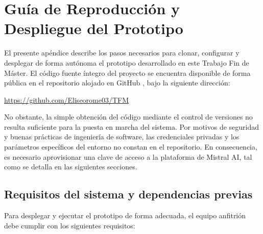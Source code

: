 \chapter{Guía de Reproducción y Despliegue del Prototipo}
\label{apendice:despliegue}

El presente apéndice describe los pasos necesarios para clonar, configurar y desplegar de forma autónoma el prototipo desarrollado en este Trabajo Fin de Máster. El código fuente íntegro del proyecto se encuentra disponible de forma pública en el repositorio alojado en GitHub \cite{tfmGitHub}, bajo la siguiente dirección:

\begin{center}
\url{https://github.com/Eliseorome03/TFM}
\end{center}

No obstante, la simple obtención del código mediante el control de versiones no resulta suficiente para la puesta en marcha del sistema. Por motivos de seguridad y buenas prácticas de ingeniería de software, las credenciales privadas y los parámetros específicos del entorno no constan en el repositorio. En consecuencia, es necesario aprovisionar una clave de acceso a la plataforma de Mistral AI, tal como se detalla en las siguientes secciones.

\section{Requisitos del sistema y dependencias previas}

Para desplegar y ejecutar el prototipo de forma adecuada, el equipo anfitrión debe cumplir con los siguientes requisitos:

